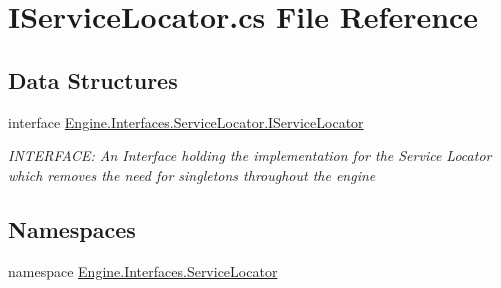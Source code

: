 \hypertarget{a00137}{}\section{I\+Service\+Locator.\+cs File Reference}
\label{a00137}
\subsection*{Data Structures}
\begin{DoxyCompactItemize}
\item 
interface \hyperlink{a00474}{Engine.\+Interfaces.\+Service\+Locator.\+I\+Service\+Locator}
\begin{DoxyCompactList}\small\item\em I\+N\+T\+E\+R\+F\+A\+CE\+: An Interface holding the implementation for the Service Locator which removes the need for singletons throughout the engine \end{DoxyCompactList}\end{DoxyCompactItemize}
\subsection*{Namespaces}
\begin{DoxyCompactItemize}
\item 
namespace \hyperlink{a00264}{Engine.\+Interfaces.\+Service\+Locator}
\end{DoxyCompactItemize}
